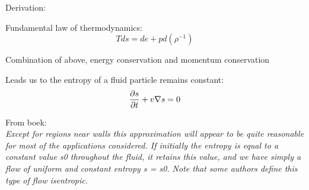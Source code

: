 \documentclass[main.tex]{subfiles}
\begin{document}
Derivation:

Fundamental law of thermodynamics:
$$T ds = de + p d\left(\rho^{-1}\right)$$

Combination of above, energy conservation and momentum conservation

Leads us to the entropy of a fluid particle remains constant:
$$\frac{\partial s}{\partial t} + v\nabla s = 0$$

From boek: \\
\textit{Except for regions near walls this approximation will appear to be quite reasonable for most of the applications considered. If initially the entropy is equal to a constant value s0 throughout the fluid, it
retains this value, and we have simply a flow of uniform and constant entropy s = s0. Note that some
authors define this type of flow isentropic.}

\end{document}
